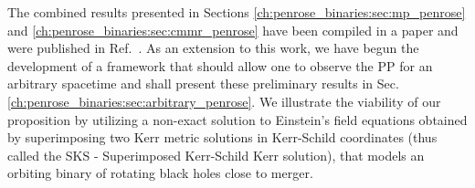The combined results presented in Sections \ref{ch:penrose_binaries:sec:mp_penrose} and \ref{ch:penrose_binaries:sec:cmmr_penrose} have been compiled in a paper and were published in Ref.~\cite{PhysRevD.104.124025}. As an extension to this work, we have begun the development of a framework that should allow one to observe the PP for an arbitrary spacetime and shall present these preliminary results in Sec. \ref{ch:penrose_binaries:sec:arbitrary_penrose}. We illustrate the viability of our proposition by utilizing a non-exact solution to Einstein's field equations obtained by superimposing two Kerr metric solutions in Kerr-Schild coordinates (thus called the SKS - Superimposed Kerr-Schild Kerr solution), that models an orbiting binary of rotating black holes close to merger.